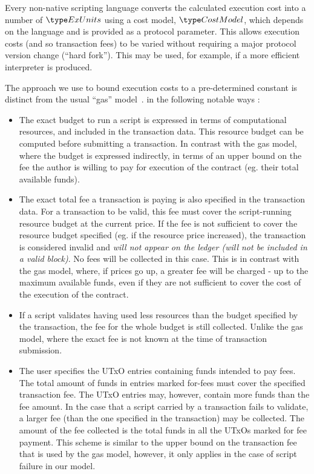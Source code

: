 Every non-native scripting language
converts the calculated execution cost into a number of $\ExUnits$ using a cost model,
$\CostMod$, which depends on the language and is provided as a protocol parameter.
This allows execution costs (and so transaction fees) to be varied without requiring a major protocol version change (``hard fork'').
This may be used, for example, if a more efficient interpreter is produced.

The approach we use to bound execution costs to a pre-determined constant is
distinct from the usual ``gas'' model~\cite{XX}. in the following notable ways :

\begin{itemize}
  \item The exact budget to run a script is expressed in terms of computational resources,
  and included in the transaction data. This resource budget can be computed before submitting a transaction.
  In contrast with the gas model, where the budget is expressed indirectly,
  in terms of an upper bound on the fee the author is willing to pay for execution of the
  contract (eg. their total available funds).

  \item The exact total fee a transaction is paying is also specified in the transaction data.
  For a transaction to be valid, this fee must cover the script-running resource budget at the current price.
  If the fee is not sufficient to cover the resource budget specified (eg. if the resource price increased),
  the transaction is considered invalid and \emph{will not appear on the ledger (will not be included in a valid block)}.
  No fees will be collected in this case.
  This is in contrast with the gas model, where, if prices go up, a greater fee will be charged - up to
  the maximum available funds, even if they are not sufficient to cover the cost of the execution of the contract.

  \item If a script validates having used less resources than the budget specified by the
  transaction, the fee for the whole budget is still collected. Unlike the gas model, where
  the exact fee is not known at the time of transaction submission.

  \item The user specifies the UTxO entries containing funds intended to pay fees.
  The total amount of funds in entries marked for-fees must cover the specified transaction fee.
  The UTxO entries may, however, contain more funds than the fee amount. In the case that a script carried by a transaction fails
  to validate, a larger fee (than the one specified in the transaction) may be collected.
  The amount of the fee collected is the total funds in all the UTxOs marked for fee payment.
  This scheme is similar to the upper bound on the transaction fee that is used by the gas model,
  however, it only applies in the case of script failure in our model.
\end{itemize}

